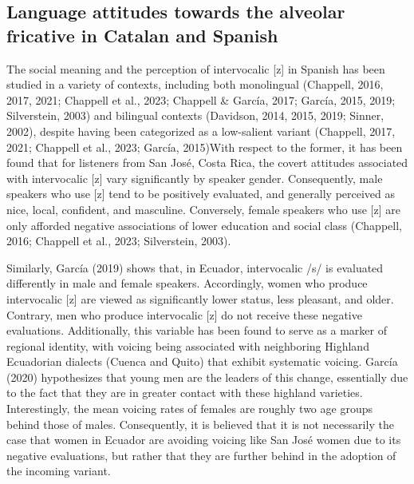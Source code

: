 \documentclass[
  a4paper,
  11pt,
  twocolumn]{article}
\begin{document}
\subsection{Language attitudes towards the alveolar fricative in Catalan and Spanish}

The social meaning and the perception of intervocalic {[}z{]} in Spanish
has been studied in a variety of contexts, including both monolingual
(Chappell, 2016, 2017, 2021; Chappell et al., 2023; Chappell \& García,
2017; García, 2015, 2019; Silverstein, 2003) and bilingual contexts
(Davidson, 2014, 2015, 2019; Sinner, 2002), despite having been
categorized as a low-salient variant (Chappell, 2017, 2021; Chappell et
al., 2023; García, 2015)With respect to the former, it has been found
that for listeners from San José, Costa Rica, the covert attitudes
associated with intervocalic {[}z{]} vary significantly by speaker
gender. Consequently, male speakers who use {[}z{]} tend to be
positively evaluated, and generally perceived as nice, local, confident,
and masculine. Conversely, female speakers who use {[}z{]} are only
afforded negative associations of lower education and social class
(Chappell, 2016; Chappell et al., 2023; Silverstein, 2003).

Similarly, García (2019) shows that, in Ecuador, intervocalic /s/ is
evaluated differently in male and female speakers. Accordingly, women
who produce intervocalic {[}z{]} are viewed as significantly lower
status, less pleasant, and older. Contrary, men who produce intervocalic
{[}z{]} do not receive these negative evaluations. Additionally, this
variable has been found to serve as a marker of regional identity, with
voicing being associated with neighboring Highland Ecuadorian dialects
(Cuenca and Quito) that exhibit systematic voicing. García (2020)
hypothesizes that young men are the leaders of this change, essentially
due to the fact that they are in greater contact with these highland
varieties. Interestingly, the mean voicing rates of females are roughly
two age groups behind those of males. Consequently, it is believed that
it is not necessarily the case that women in Ecuador are avoiding
voicing like San José women due to its negative evaluations, but rather
that they are further behind in the adoption of the incoming variant.
\end{document}
